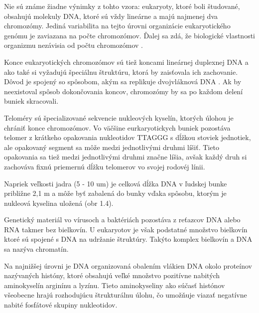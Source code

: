 Nie sú známe žiadne výnimky z tohto vzora: eukaryoty, ktoré boli študované, obsahujú molekuly DNA, ktoré sú vždy lineárne a majú najmenej dva chromozómy. 
Jediná variabilita na tejto úrovni organizácie eukaryotického genómu je zaviazana na počte chromozómov.
Ďalej sa zdá, že biologické vlastnosti organizmu nezávisia od počtu chromozómov \cite{Genomes3}.

Konce eukaryotických chromozómov sú tiež koncami lineárnej duplexnej DNA a ako také si vyžadujú špeciálnu štruktúru, ktorá by zaisťovala ich zachovanie.
Dôvod je spojený so spôsobom, akým sa replikuje dvojvláknová DNA \cite{PrinciplesOfGeneManipulation}.
Ak by neexistoval spôsob dokončovania koncov, chromozómy by sa po každom delení buniek skracovali.

Teloméry sú špecializované sekvencie nukleových kyselín, ktorých úlohou je chrániť konce chromozómov.
Vo väčšine eurkaryotickych buniek pozostáva telomer z krátkeho opakovania nukleotidov TTAGGG s dĺžkou stoviek jednotiek, ale opakovaný segment sa môže medzi jednotlivými druhmi líšiť.
Tieto opakovania sa tiež medzi jednotlivými druhmi značne líšia, avšak každý druh si zachováva fixnú priemernú dĺžku telomerov vo svojej rodovéj línii.

Napriek veľkosti jadra (5 - 10 um) je celková dĺžka DNA v ľudskej bunke približne 2,1 m a môže byť zabalená do bunky vďaka spôsobu, ktorým je nukleová kyselina uložená (obr 1.4).

Genetický materiál vo vírusoch a baktériách pozostáva z reťazcov DNA alebo RNA takmer bez bielkovín.
U eukaryotov je však podstatné množstvo bielkovín ktoré sú spojené s DNA na udržanie štruktúry.
Takýto komplex bielkovín a DNA sa nazýva chromatín.

Na najnižšej úrovni je DNA organizovaná obalením vlákien DNA okolo proteínov nazývaných históny, ktoré obsahujú veľké množstvo pozitívne nabitých aminokyselín arginínu a lyzínu.
Tieto aminokyseliny ako súčasť histónov všeobecne hrajú rozhodujúcu štrukturálnu úlohu, čo umožňuje viazať negatívne nabité fosfátové skupiny nukleotidov.

